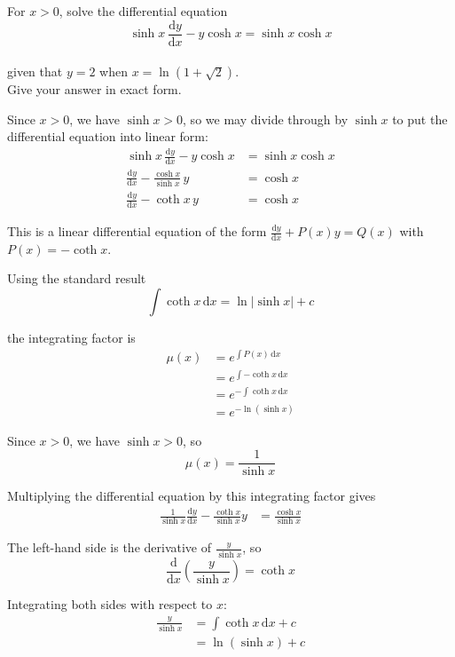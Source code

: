 \documentclass[leqno]{article}
\begin{document}
\begin{enumerate}[
  label=\textbf{\arabic*.},
  leftmargin=*,
  topsep=0pt,
  partopsep=0pt,
  parsep=0pt
]
For $x>0$, solve the differential equation\\
\[
\sinh x\,\frac{\mathrm{d}y}{\mathrm{d}x} - y\cosh x = \sinh x\cosh x
\] \\
given that $y = 2$ when $x = \ln(1+\sqrt{2})$. \\
Give your answer in exact form. 

\vspace*{10pt}

\begin{djsSolution}
Since $x>0$, we have $\sinh x>0$, so we may divide through by $\sinh x$ to put the differential equation into linear form:
\begin{align*}
\sinh x\,\frac{\mathrm{d}y}{\mathrm{d}x} - y\cosh x &= \sinh x\cosh x \\
\frac{\mathrm{d}y}{\mathrm{d}x} - \frac{\cosh x}{\sinh x}\,y &= \cosh x \\
\frac{\mathrm{d}y}{\mathrm{d}x} - \coth x\,y &= \cosh x
\end{align*}

This is a linear differential equation of the form \(\frac{\mathrm{d}y}{\mathrm{d}x}+P(x)y=Q(x)\) with \(P(x)=-\coth x\).

Using the standard result
\[
\int \coth x\,\mathrm{d}x=\ln|\sinh x|+c
\]

the integrating factor is
\begin{align*}
\mu(x) &= e^{\int P(x)\,\mathrm{d}x} \\
&= e^{\int -\coth x\,\mathrm{d}x} \\
&= e^{-\int \coth x\,\mathrm{d}x} \\
&= e^{-\ln(\sinh x)}
\end{align*}

Since $x>0$, we have $\sinh x>0$, so
\[
\mu(x)=\frac{1}{\sinh x}
\]

Multiplying the differential equation by this integrating factor gives
\begin{align*}
\frac{1}{\sinh x}\frac{\mathrm{d}y}{\mathrm{d}x} - \frac{\coth x}{\sinh x}y &= \frac{\cosh x}{\sinh x}
\end{align*}

The left-hand side is the derivative of $\frac{y}{\sinh x}$, so
\[
\frac{\mathrm{d}}{\mathrm{d}x}\left(\frac{y}{\sinh x}\right)=\coth x
\]

Integrating both sides with respect to $x$:
\begin{align*}
\frac{y}{\sinh x} &= \int \coth x\,\mathrm{d}x + c \\
&= \ln(\sinh x) + c
\end{align*}


\end{djsSolution}
\end{enumerate}
\end{document}
